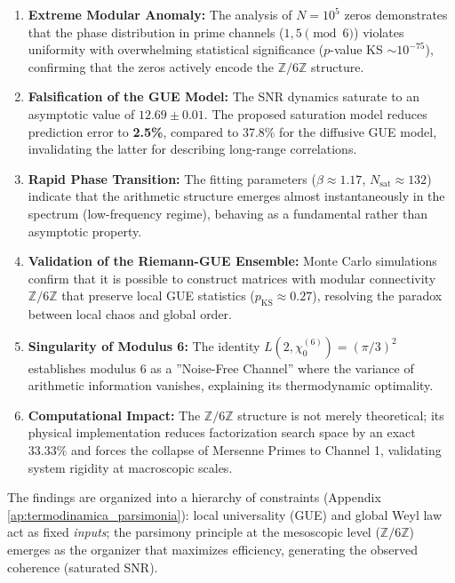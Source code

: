 \documentclass[12pt, a4paper]{article}
\theoremstyle{plain}
\theoremstyle{definition}
\theoremstyle{remark}
\newcommand{\Z}{\mathbb{Z}}
\begin{document}
\begin{enumerate}[label=(\arabic*)]
\item \textbf{Extreme Modular Anomaly:} The analysis of $N=10^5$ zeros demonstrates that the phase distribution in prime channels ($1,5 \pmod 6$) violates uniformity with overwhelming statistical significance ($p$-value KS $\sim 10^{-75}$), confirming that the zeros actively encode the $\Z/6\Z$ structure.

\item \textbf{Falsification of the GUE Model:} The SNR dynamics saturate to an asymptotic value of $12.69 \pm 0.01$. The proposed saturation model reduces prediction error to \textbf{2.5\%}, compared to 37.8\% for the diffusive GUE model, invalidating the latter for describing long-range correlations.

\item \textbf{Rapid Phase Transition:} The fitting parameters ($\beta \approx 1.17$, $N_{\text{sat}} \approx 132$) indicate that the arithmetic structure emerges almost instantaneously in the spectrum (low-frequency regime), behaving as a fundamental rather than asymptotic property.

\item \textbf{Validation of the Riemann-GUE Ensemble:} Monte Carlo simulations confirm that it is possible to construct matrices with modular connectivity $\Z/6\Z$ that preserve local GUE statistics ($p_{\text{KS}} \approx 0.27$), resolving the paradox between local chaos and global order.

\item \textbf{Singularity of Modulus 6:} The identity $L(2,\chi_0^{(6)}) = (\pi/3)^2$ establishes modulus 6 as a ''Noise-Free Channel'' where the variance of arithmetic information vanishes, explaining its thermodynamic optimality.

\item \textbf{Computational Impact:} The $\mathbb{Z}/6\mathbb{Z}$ structure is not merely theoretical; its physical implementation reduces factorization search space by an exact $33.33\%$ and forces the collapse of Mersenne Primes to Channel 1, validating system rigidity at macroscopic scales.
\end{enumerate}

The findings are organized into a hierarchy of constraints (Appendix \ref{ap:termodinamica_parsimonia}): local universality (GUE) and global Weyl law act as fixed \textit{inputs}; the parsimony principle at the mesoscopic level ($\mathbb{Z}/6\mathbb{Z}$) emerges as the organizer that maximizes efficiency, generating the observed coherence (saturated SNR).
\end{document}
